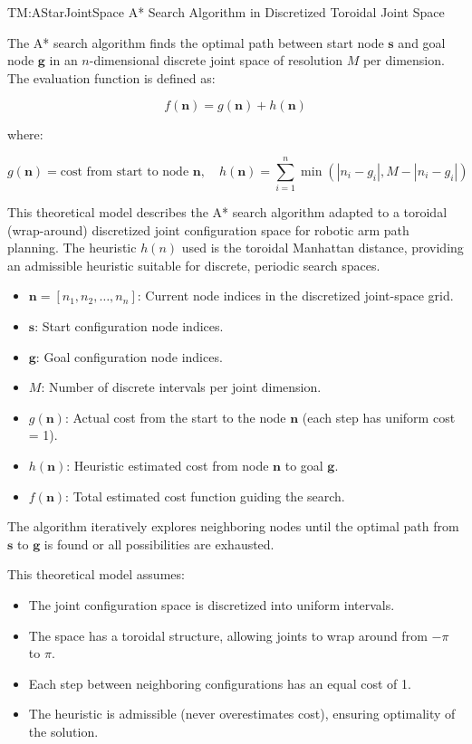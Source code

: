 \documentclass[12pt]{article}
\newcommand{\deftheory}[9][Not Applicable]
{
\newpage
\noindent \rule{\textwidth}{0.5mm}

\paragraph{RefName: } \textbf{#2} \phantomsection 
\label{#2}

\paragraph{Label:} #3

\noindent \rule{\textwidth}{0.5mm}

\paragraph{Equation:}

#4

\paragraph{Description:}

#5

\paragraph{Notes:}

#6

\paragraph{Source:}

#7

\paragraph{Ref.\ By:}

#8

\paragraph{Preconditions for \hyperref[#2]{#2}:}
\label{#2_precond}

#9

\paragraph{Derivation for \hyperref[#2]{#2}:}
\label{#2_deriv}

#1

\noindent \rule{\textwidth}{0.5mm}

}
\begin{document}
\noindent
{}
{TM:AStarJointSpace}
{A* Search Algorithm in Discretized Toroidal Joint Space}
{
The A* search algorithm finds the optimal path between start node $\mathbf{s}$ and goal node $\mathbf{g}$ in an $n$-dimensional discrete joint space of resolution $M$ per dimension. The evaluation function is defined as:

\[
f(\mathbf{n}) = g(\mathbf{n}) + h(\mathbf{n})
\]

where:

\[
g(\mathbf{n})=\text{cost from start to node } \mathbf{n}, \quad h(\mathbf{n})=\sum_{i=1}^{n} \min\left(|n_i-g_i|, M-|n_i-g_i|\right)
\]

}
{
This theoretical model describes the A* search algorithm adapted to a toroidal (wrap-around) discretized joint configuration space for robotic arm path planning. The heuristic $h(n)$ used is the toroidal Manhattan distance, providing an admissible heuristic suitable for discrete, periodic search spaces.

\begin{itemize}
    \item $\mathbf{n}=[n_1, n_2, \dots, n_n]$: Current node indices in the discretized joint-space grid.
    \item $\mathbf{s}$: Start configuration node indices.
    \item $\mathbf{g}$: Goal configuration node indices.
    \item $M$: Number of discrete intervals per joint dimension.
    \item $g(\mathbf{n})$: Actual cost from the start to the node $\mathbf{n}$ (each step has uniform cost = 1).
    \item $h(\mathbf{n})$: Heuristic estimated cost from node $\mathbf{n}$ to goal $\mathbf{g}$.
    \item $f(\mathbf{n})$: Total estimated cost function guiding the search.
\end{itemize}

The algorithm iteratively explores neighboring nodes until the optimal path from $\mathbf{s}$ to $\mathbf{g}$ is found or all possibilities are exhausted.
}
{
This theoretical model assumes:

\begin{itemize}
    \item The joint configuration space is discretized into uniform intervals.
    \item The space has a toroidal structure, allowing joints to wrap around from $-\pi$ to $\pi$.
    \item Each step between neighboring configurations has an equal cost of 1.
    \item The heuristic is admissible (never overestimates cost), ensuring optimality of the solution.
\end{itemize}
}
\end{document}
